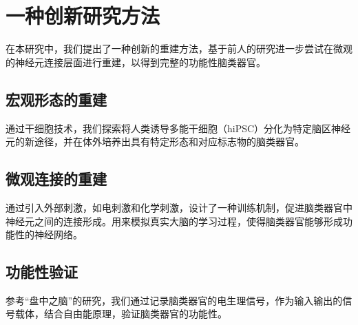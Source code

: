 \chapter{一种创新研究方法}\label{chap:methodlogy}
在本研究中，我们提出了一种创新的重建方法，基于前人的研究进一步尝试在微观的神经元连接层面进行重建，以得到完整的功能性脑类器官。

\section{宏观形态的重建}\label{sec:macro-reconstruction}
通过干细胞技术，我们探索将人类诱导多能干细胞（hiPSC）分化为特定脑区神经元的新途径，并在体外培养出具有特定形态和对应标志物的脑类器官。

\section{微观连接的重建}\label{sec:micro-reconstruction}
通过引入外部刺激，如电刺激和化学刺激，设计了一种训练机制，促进脑类器官中神经元之间的连接形成。用来模拟真实大脑的学习过程，使得脑类器官能够形成功能性的神经网络。

\section{功能性验证}\label{sec:functional-verification}
参考“盘中之脑”的研究，我们通过记录脑类器官的电生理信号，作为输入输出的信号载体，结合自由能原理，验证脑类器官的功能性。
